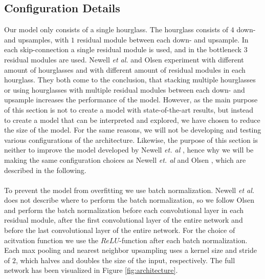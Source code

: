 \documentclass[./main.tex]{subfiles}
\begin{document}
\subsection{Configuration Details}\label{subsec:conf_details}
Our model only consists of a single hourglass. The hourglass consists of $4$ down- and upsamples, with $1$ residual module between each down- and upsample. In each skip-connection a single residual module is used, and in the bottleneck $3$ residual modules are used. Newell \textit{et al.} \cite{Newell} and Olsen \cite{Camilla} experiment with different amount of hourglasses and with different amount of residual modules in each hourglass. They both come to the conclusion, that stacking multiple hourglasses or using hourglasses with multiple residual modules between each down- and upsample increases the performance of the model. However, as the main purpose of this section is not to create a model with state-of-the-art results, but instead to create a model that can be interpreted and explored, we have chosen to reduce the size of the model. For the same reasons, we will not be developing and testing various configurations of the architecture. Likewise, the purpose of this section is neither to improve the model developed by Newell \textit{et. al} \cite{Newell}, hence why we will be making the same configuration choices as Newell \textit{et. al} \cite{Newell} and Olsen \cite{Camilla}, which are described in the following.
\\
\\
To prevent the model from overfitting we use batch normalization. Newell \textit{et al.} does not describe where to perform the batch normalization, so we follow Olsen \cite{Camilla} and perform the batch normalization before each convolutional layer in each residual module, after the first convolutional layer of the entire network and before the last convolutional layer of the entire network. For the choice of acitvation function we use the $ReLU$-function after each batch normalization. Each max pooling and nearest neighbor upsampling uses a kernel size and stride of $2$, which halves and doubles the size of the input, respectively. The full network has been visualized in Figure \ref{fig:architecture}.
\\
\end{document}
